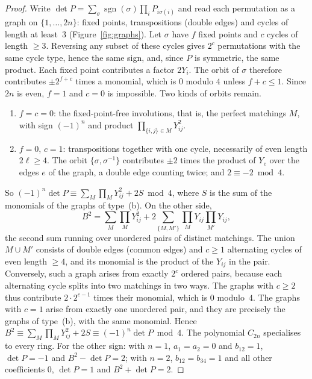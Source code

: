 \documentclass[11pt,a4paper]{amsart}
\theoremstyle{definition}
\theoremstyle{remark}
\begin{document}
\begin{proof}
Write $\det P = \sum_\sigma \operatorname{sgn}(\sigma)\prod_i P_{i\sigma(i)}$ and read each permutation as a graph on $\{1, \dots, 2n\}$: fixed points, transpositions (double edges) and cycles of length at least~$3$ (Figure~\ref{fig:graphs}). Let $\sigma$ have $f$ fixed points and $c$ cycles of length $\ge 3$. Reversing any subset of these cycles gives $2^c$ permutations with the same cycle type, hence the same sign, and, since $P$ is symmetric, the same product. Each fixed point contributes a factor $2Y_i$. The orbit of $\sigma$ therefore contributes $\pm2^{f+c}$ times a monomial, which is $0$ modulo $4$ unless $f + c \le 1$. Since $2n$ is even, $f = 1$ and $c = 0$ is impossible. Two kinds of orbits remain.
\begin{enumerate}[label=(\alph*)]
\item $f = c = 0$: the fixed-point-free involutions, that is, the perfect matchings $M$, with sign $(-1)^n$ and product $\prod_{\{i,j\}\in M}Y_{ij}^2$.
\item $f = 0$, $c = 1$: transpositions together with one cycle, necessarily of even length $2\ell \ge 4$. The orbit $\{\sigma, \sigma^{-1}\}$ contributes $\pm2$ times the product of $Y_e$ over the edges $e$ of the graph, a double edge counting twice; and $2 \equiv -2 \bmod 4$.
\end{enumerate}
So $(-1)^n\det P \equiv \sum_M \prod_M Y_{ij}^2 + 2S \bmod 4$, where $S$ is the sum of the monomials of the graphs of type~(b). On the other side,
\[
B^2 = \sum_M \prod_M Y_{ij}^2 + 2\sum_{\{M, M'\}}\prod_M Y_{ij}\prod_{M'} Y_{ij},
\]
the second sum running over unordered pairs of distinct matchings. The union $M \cup M'$ consists of double edges (common edges) and $c \ge 1$ alternating cycles of even length $\ge 4$, and its monomial is the product of the $Y_{ij}$ in the pair. Conversely, such a graph arises from exactly $2^c$ ordered pairs, because each alternating cycle splits into two matchings in two ways. The graphs with $c \ge 2$ thus contribute $2 \cdot 2^{c-1}$ times their monomial, which is $0$ modulo~$4$. The graphs with $c = 1$ arise from exactly one unordered pair, and they are precisely the graphs of type~(b), with the same monomial. Hence $B^2 \equiv \sum_M \prod_M Y_{ij}^2 + 2S \equiv (-1)^n\det P \bmod 4$. The polynomial $C_{2n}$ specialises to every ring. For the other sign: with $n = 1$, $a_1 = a_2 = 0$ and $b_{12} = 1$, $\det P = -1$ and $B^2 - \det P = 2$; with $n = 2$, $b_{12} = b_{34} = 1$ and all other coefficients $0$, $\det P = 1$ and $B^2 + \det P = 2$.
\end{proof}
\end{document}

